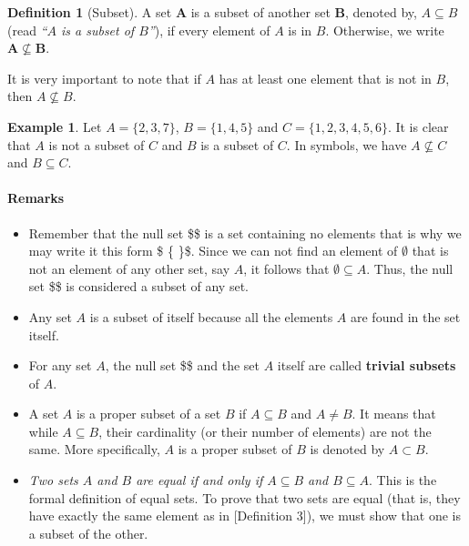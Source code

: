 \documentclass[]{book}
\providecommand{\tightlist}{%
  \setlength{\itemsep}{0pt}\setlength{\parskip}{0pt}}
\let\oldparagraph\paragraph
\renewcommand{\paragraph}[1]{\oldparagraph{#1}\mbox{}}
\theoremstyle{definition}
\newtheorem{definition}{Definition}[chapter]
\theoremstyle{definition}
\newtheorem{example}{Example}[chapter]
\theoremstyle{definition}
\theoremstyle{remark}
\begin{document}
\begin{definition}[Subset]
\protect\hypertarget{def:unnamed-chunk-13}{}{\label{def:unnamed-chunk-13} \iffalse (Subset) \fi{} }A set \(\textbf{A}\) is a subset of another set \(\textbf{B}\), denoted by, \textbf{$A \subseteq B $} (read \emph{``\(A\) is a subset of \(B\)''}), if every element of \(A\) is in \(B\). Otherwise, we write \(\boldsymbol{A \nsubseteq B}\).
\end{definition}

It is very important to note that if \(A\) has at least one element that is not in \(B\), then \(A \nsubseteq B\).

\begin{example}
\protect\hypertarget{exm:unnamed-chunk-14}{}{\label{exm:unnamed-chunk-14} }Let \(A = \{2,3,7\}\), \(B=\{1,4,5 \}\) and \(C = \{1,2,3,4,5,6\}\). It is clear that \(A\) is not a subset of \(C\) and \(B\) is a subset of \(C\). In symbols, we have \(A \nsubseteq C\) and \(B \subseteq C\).
\end{example}

\hypertarget{remarks-1}{%
\paragraph{Remarks}\label{remarks-1}}

\begin{itemize}
\tightlist
\item
  Remember that the null set \$\emptyset \$ is a set containing no elements that is why we may write it this form \$ \{ \}\$. Since we can not find an element of \(\emptyset\) that is not an element of any other set, say \(A\), it follows that \(\emptyset \subseteq A\). Thus, the null set \$\emptyset \$ is considered a subset of any set.
\item
  Any set \(A\) is a subset of itself because all the elements \(A\) are found in the set itself.
\item
  For any set \(A\), the null set \$\emptyset \$ and the set \(A\) itself are called \textbf{trivial subsets} of \(A\).
\item
  A set \(A\) is a proper subset of a set \(B\) if \(A \subseteq B\) and \(A \neq B\). It means that while \(A \subseteq B\), their cardinality (or their number of elements) are not the same. More specifically, \(A\) is a proper subset of \(B\) is denoted by \(A \subset B\).
\item
  \emph{Two sets \(A\) and \(B\) are equal if and only if \(A \subseteq B\) and \(B \subseteq A\)}. This is the formal definition of equal sets. To prove that two sets are equal (that is, they have exactly the same element as in {[}Definition 3{]}), we must show that one is a subset of the other.
\end{itemize}
\end{document}
